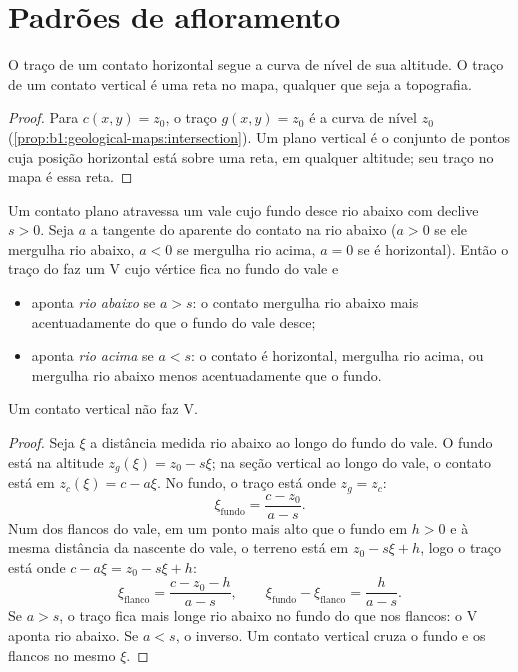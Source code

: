 \section{Padrões de afloramento}

\begin{proposition}\label{prop:b1:geological-maps:hv}
O traço de um contato horizontal segue a curva de nível de sua altitude. O traço de um contato vertical é uma reta no mapa, qualquer que seja a topografia.
\end{proposition}

\begin{proof}
Para $c(x,y) = z_0$, o traço $g(x,y) = z_0$ é a curva de nível $z_0$
(\cref{prop:b1:geological-maps:intersection}). Um plano vertical é o conjunto de
pontos cuja posição horizontal está sobre uma reta, em qualquer altitude;
seu traço no mapa é essa reta.
\end{proof}

\begin{theorem}[A regra do V]\label{thm:b1:geological-maps:v-rule}
Um contato plano atravessa um vale cujo fundo desce rio abaixo com declive $s > 0$. Seja $a$ a tangente do  aparente do contato na  rio abaixo ($a > 0$ se ele mergulha rio abaixo, $a < 0$ se mergulha rio acima, $a = 0$ se é horizontal). Então o traço do  faz um V cujo vértice fica no fundo do vale e
\begin{itemize}
  \item aponta \emph{rio abaixo} se $a > s$: o contato mergulha rio abaixo mais acentuadamente do que o fundo do vale desce;
  \item aponta \emph{rio acima} se $a < s$: o contato é horizontal, mergulha rio acima, ou mergulha rio abaixo menos acentuadamente que o fundo.
\end{itemize}
Um contato vertical não faz V.
\end{theorem}

\begin{proof}
Seja $\xi$ a distância medida rio abaixo ao longo do fundo do vale. O fundo está na altitude $z_g(\xi) = z_0 - s\xi$; na seção vertical ao longo do vale, o contato está em $z_c(\xi) = c - a\xi$. No fundo, o traço está onde $z_g = z_c$:
\[
  \xi_{\text{fundo}} = \frac{c - z_0}{a - s}.
\]
Num dos flancos do vale, em um ponto mais alto que o fundo em $h > 0$ e à mesma distância da nascente do vale, o terreno está em $z_0 - s\xi + h$, logo o traço está onde $c - a\xi = z_0 - s\xi + h$:
\[
  \xi_{\text{flanco}} = \frac{c - z_0 - h}{a - s}, \qquad
  \xi_{\text{fundo}} - \xi_{\text{flanco}} = \frac{h}{a - s}.
\]
Se $a > s$, o traço fica mais longe rio abaixo no fundo do que nos flancos: o V aponta rio abaixo. Se $a < s$, o inverso. Um contato vertical cruza o fundo e os flancos no mesmo $\xi$.
\end{proof}

